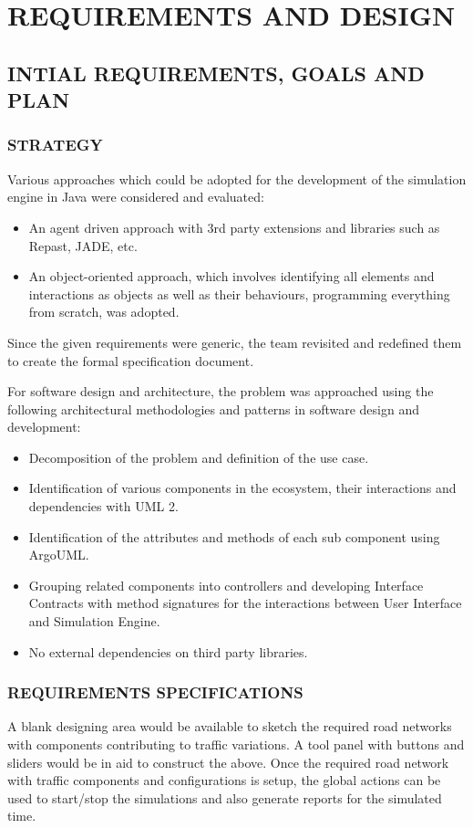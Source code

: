 \documentclass[11pt,a4paper]{article}
\begin{document}
\section{\textbf{REQUIREMENTS AND DESIGN}}
	\subsection{INTIAL REQUIREMENTS, GOALS AND PLAN}
		\subsubsection{STRATEGY}
			Various approaches which could be adopted for the development of
			the simulation engine in Java were considered and evaluated:
			\begin{itemize}
			\setlength\itemsep{0.2em}
				\item An agent driven approach with 3rd party extensions and libraries such as Repast, JADE, etc.
				\item An object-oriented approach, which involves identifying all elements and interactions as objects as well as their behaviours, programming everything from scratch, was adopted.
			\end{itemize}

	Since the given requirements were generic, the team revisited 
	and redefined them to create the formal specification document.

	\setlength{\parindent}{0cm}\bigskip
	For software design and architecture, the problem was approached using
	the following architectural methodologies and patterns in software
	design and development:
	\begin{itemize}
	\setlength\itemsep{0.2em}
		\item Decomposition of the problem and definition of the use case.
		\item Identification of various components in the ecosystem, their 	interactions and dependencies with UML 2.		\item Identification of the attributes and methods of each sub component using ArgoUML.
		\item Grouping related components into controllers and developing Interface Contracts with method signatures for the interactions between User Interface and Simulation Engine.
		\item No external dependencies on third party libraries.
	\end{itemize}

	\subsubsection{REQUIREMENTS SPECIFICATIONS}
	A blank designing area would be available to sketch the required road
	networks with components contributing to traffic variations. A tool
	panel with buttons and sliders would be in aid to construct the above.
	Once the required road network with traffic components and
	configurations is setup, the global actions can be used to start/stop
	the simulations and also generate reports for the simulated time.
\end{document}
